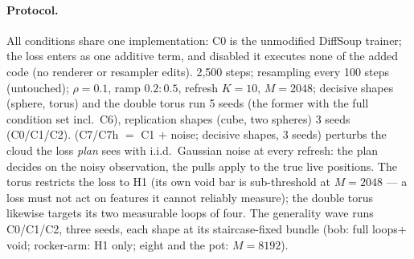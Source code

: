 \paragraph{Protocol.}
All conditions share one implementation: C0 is the unmodified DiffSoup
trainer; the loss enters as one additive term, and disabled it executes
none of the added code (no renderer or resampler edits).
2{,}500 steps; resampling every 100 steps (untouched);
$\rho{=}0.1$, ramp $0.2{:}0.5$, refresh $K{=}10$, $M{=}2048$; decisive shapes
(sphere, torus) and the double torus run 5 seeds (the former with the
full condition set incl.\ C6), replication shapes (cube, two spheres)
3 seeds (C0/C1/C2).
(C7/C7h $=$ C1 $+$ noise; decisive shapes, 3 seeds) perturbs the cloud
the loss \emph{plan} sees with i.i.d.\ Gaussian noise at every refresh:
the plan decides on the noisy observation, the pulls apply to the true
live positions.
The torus restricts the loss to H1 (its own void bar is sub-threshold at
$M{=}2048$ --- a loss must not act on features it cannot reliably
measure); the double torus likewise targets its two measurable loops of
four. The generality wave runs C0/C1/C2, three seeds, each shape at its
staircase-fixed bundle (bob: full loops$+$void; rocker-arm: H1 only;
eight and the pot: $M{=}8192$).

